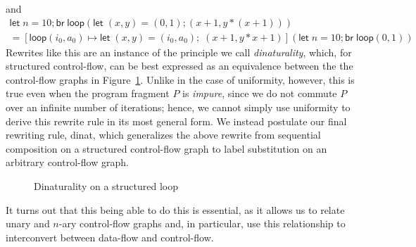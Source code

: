 \documentclass[acmsmall,screen,review]{acmart}
\newcommand{\ms}[1]{\ensuremath{\mathsf{#1}}}
\newcommand{\letexpr}[3]{\ensuremath{\ms{let}\;#1 = #2;\;#3}}
\newcommand{\letstmt}[3]{\ensuremath{\ms{let}\;#1 = #2; #3}}
\newcommand{\brle}[1]{{\scriptsize\textsf{#1}}}
\begin{document}
and
\begin{multline*}
  \letstmt{n}{10}{\ms{br}\;\ms{loop}(
    \letstmt{(x, y)}{(0, 1)}{(x + 1, y * (x + 1))}
  )} \\
  =
  [\ms{loop}(i_0, a_0) \mapsto \letexpr{(x, y)}{(i_0, a_0)}{(x + 1, y * x + 1)}](
    \letstmt{n}{10}{\ms{br}\;\ms{loop}(0, 1)}
  )
\end{multline*}
Rewrites like this are an instance of the principle we call \emph{dinaturality}, which, for
structured control-flow, can be best expressed as an equivalence between the the control-flow graphs
in Figure~\ref{fig:dinat-struct-cfg}. Unlike in the case of uniformity, however, this is true even
when the program fragment $P$ is \emph{impure}, since we do not commute $P$ over an infinite number
of iterations; hence, we cannot simply use uniformity to derive this rewrite rule in its most
general form. We instead postulate our final rewriting rule, \brle{dinat}, which generalizes the
above rewrite from sequential composition on a structured control-flow graph to label substitution
on an arbitrary control-flow graph. 

\begin{figure}
  \caption{
    Dinaturality on a structured loop
  }
  \Description{}
  \label{fig:dinat-struct-cfg}
\end{figure}
It turns out that this being able to do this is essential, as it allows us to relate unary and
$n$-ary control-flow graphs and, in particular, use this relationship to interconvert between
data-flow and control-flow.
\end{document}

